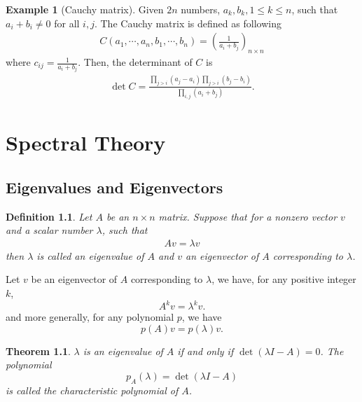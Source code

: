 \documentclass[11pt]{book}
\newtheorem{definition}{Definition}[section]
\newtheorem{theorem}{Theorem}[section]
\theoremstyle{definition}
\newtheorem{example}{Example}[section]
\numberwithin{equation}{subsection}
\begin{document}
\medskip

\begin{example}[Cauchy matrix]
Given $2n$ numbers, $a_k, b_k, 1\leq k\leq n$, such that $a_i + b_i \neq 0$ for all $i,j$. The Cauchy matrix is defined as following
\begin{align*}
    C(a_1,\cdots,a_n, b_1,\cdots,b_n) = \left(\frac{1}{a_i + b_j}\right)_{n\times n}
\end{align*}
where $c_{ij} = \frac{1}{a_i + b_j}$. Then, the determinant of $C$ is 
\begin{align*}
    \det C = \frac{\prod_{j>i}(a_j - a_i)\prod_{j>i}(b_j - b_i)}{\prod_{i,j}(a_i + b_j)}.
\end{align*}
\end{example}



\medskip

\chapter{Spectral Theory}

\section{Eigenvalues and Eigenvectors}

\begin{definition}
Let $A$ be an $n\times n$ matrix. Suppose that for a nonzero vector $v$ and a scalar number $\lambda$, such that 
\begin{align*}
    Av = \lambda v
\end{align*}
then $\lambda$ is called an eigenvalue of $A$ and $v$ an eigenvector of $A$ corresponding to $\lambda$.
\end{definition}

Let $v$ be an eigenvector of $A$ corresponding to $\lambda$, we have, for any positive integer $k$, 
$$A^k v = \lambda^k v.$$
and more generally, for any polynomial $p$, we have 
$$p(A)v = p(\lambda)v.$$

\medskip

\begin{theorem}
$\lambda$ is an eigenvalue of $A$ if and only if $\det (\lambda I-A) = 0$. The polynomial
$$p_A(\lambda) = \det (\lambda I-A)$$
is called the characteristic polynomial of $A$.
\end{theorem}

\medskip
\end{document}
